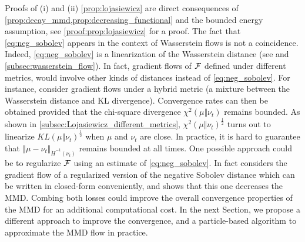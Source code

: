 Proofs of (i) and (ii) \cref{prop:lojasiewicz} are direct consequences of \cref{prop:decay_mmd,prop:decreasing_functional} and the bounded energy assumption, see  \cref{proof:prop:lojasiewicz} for a proof. The fact that \cref{eq:neg_sobolev} appears in the context of Wasserstein flows is not a coincidence. Indeed, \cref{eq:neg_sobolev} is a linearization of the Wasserstein distance (see \cite{Peyre:2011,Otto:2000} and \cref{subsec:wasserstein_flow}). In fact, gradient flows of ${{\mathcal F}}$ defined under different metrics, would involve other kinds of distances instead of \cref{eq:neg_sobolev}. 
For instance, \cite{rotskoff2019global} consider gradient flows under a hybrid metric (a mixture between the Wasserstein distance and KL divergence). Convergence rates can then be obtained provided that the chi-square divergence $\chi^2(\mu\Vert \nu_t)$ remains bounded. As shown in \cref{subsec:Lojasiewicz_different_metrics}, $\chi^2(\mu\Vert \nu_t)^{\frac{1}{2}}$ turns out to linearize $KL(\mu\Vert \nu_t)^{\frac{1}{2}}$ when $\mu$ and $\nu_t$ are close. In practice, it is hard to guarantee that $\Vert \mu - \nu_t \Vert_{\dot{H}^{-1}(\nu_t)} $ remains bounded at all times. One possible approach could be to regularize ${{\mathcal F}}$ using an estimate of \cref{eq:neg_sobolev}. In fact \cite{Mroueh:2019} considers the gradient flow of a regularized version of the negative Sobolev distance which can be written in closed-form conveniently, and shows that this one decreases the MMD. Combing both losses could improve the overall convergence properties of the MMD for an additional computational cost. In the next Section, we propose a different approach to improve the convergence, and a particle-based algorithm to approximate the MMD flow in practice.
